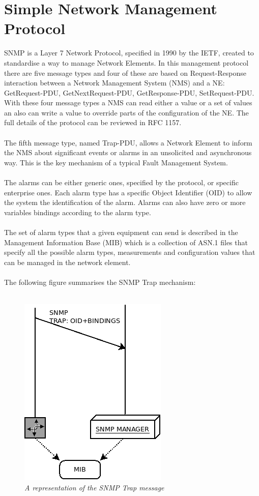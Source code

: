 \documentclass[10pt,a4paper]{report}
\begin{document}
\chapter{Simple Network Management Protocol}
SNMP is a Layer 7 Network Protocol, specified in 1990 by the IETF, created to standardise a way to manage Network Elements. In this management protocol there are five message types and four of these are based on Request-Response interaction between a Network Management System (NMS) and a NE: GetRequest-PDU, GetNextRequest-PDU, GetResponse-PDU, SetRequest-PDU. With these four message types a NMS can read either a value or a set of values an also can write a value to override parts of the configuration of the NE. The full details of the protocol can be reviewed in RFC 1157\cite{snmp}.
\\\\
The fifth message type, named Trap-PDU, allows a Network Element to inform the NMS about significant events or alarms in an unsolicited and asynchronous way\cite{ciscoTraps}. This is the key mechanism of a typical Fault Management System.
\\\\
The alarms can be either generic ones, specified by the protocol, or specific enterprise ones. Each alarm type has a specific Object Identifier (OID) to allow the system the identification of the alarm. Alarms can also have zero or more variables bindings according to the alarm type.
\\\\
The set of alarm types that a given equipment can send is described in the Management Information Base (MIB) which is a collection of ASN.1 files that specify all the possible alarm types, measurements and configuration values that can be managed in the network element.
\\\\
The following figure summarises the SNMP Trap mechanism:
\\\\
\begin{figure}[H]
 \includegraphics[scale=0.4]{SNMP_Trap.png}
  \centering
  \caption{\textit{A representation of the SNMP Trap message}}
  \label{fig:snmp_trap}
\end{figure}	
\end{document}
